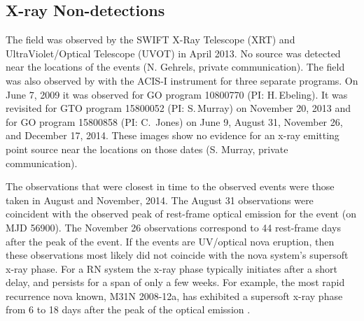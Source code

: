 \subsection{X-ray Non-detections}\label{sec:Xray}

The  field was observed by the SWIFT X-Ray Telescope (XRT)
and UltraViolet/Optical Telescope (UVOT) in April 2013.  No source was
detected near the locations of the \spock events (N. Gehrels, private
communication).  The field was also observed by \Chandra with the
ACIS-I instrument for three separate programs.  On June 7, 2009 it was
observed for GO program 10800770 (PI: H.\,Ebeling).  It was revisited
for GTO program 15800052 (PI: S.\,Murray) on November 20, 2013 and for
GO program 15800858 (PI: C.\, Jones) on June 9, August 31, November
26, and December 17, 2014. These \Chandra images show no evidence for
an x-ray emitting point source near the \spock locations on those
dates (S. Murray, private communication).

The \Chandra observations that were closest in time to the observed
\spock events were those taken in August and November, 2014.  The
August 31 observations were coincident with the observed peak of
rest-frame optical emission for the \spocktwo event (on MJD
56900). The November 26 observations correspond to 44 rest-frame days
after the peak of the \spocktwo event. If the \spock events are
UV/optical nova eruption, then these observations most likely did not
coincide with the nova system's supersoft x-ray phase. For a RN system
the x-ray phase typically initiates after a short delay, and persists
for a span of only a few weeks. For example, the most rapid recurrence
nova known, M31N 2008-12a, has exhibited a supersoft x-ray phase from
6 to 18 days after the peak of the optical emission
\citep{Henze:2015a}.
